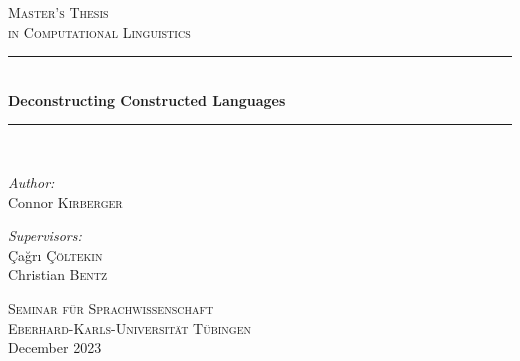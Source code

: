 \documentclass[12pt,a4paper]{article}
\numberwithin{figure}{section}
\numberwithin{table}{section}
\numberwithin{definition}{section}
\newcommand{\HRule}{\rule{\linewidth}{0.5mm}}
\begin{document}
\begin{titlepage}
\begin{center}



\textsc{\LARGE Master's Thesis}\\[0.8cm]

\textsc{\large in Computational Linguistics}\\[0.5cm]

\HRule \\[0.4cm]
{  \bfseries \fontsize{22}{37} \selectfont Deconstructing Constructed Languages}\\
\vspace{0.4em}

\HRule \\[1.5cm]



\begin{minipage}{0.4\textwidth}
\begin{flushleft} \large
\emph{Author:}\\
Connor \textsc{Kirberger}
\end{flushleft}
\end{minipage}
\begin{minipage}{0.5\textwidth}
\begin{flushright} \large
\emph{Supervisors:} \\
Çağrı \textsc{Çöltekin} \\
Christian \textsc{Bentz}\\
\end{flushright}
\end{minipage}


\vfill



\textsc{\large Seminar f\"ur Sprachwissenschaft\\Eberhard-Karls-Universit\"at T\"ubingen}\\[1.5cm]



{\large December 2023}

\end{center}
\end{titlepage}
\end{document}
